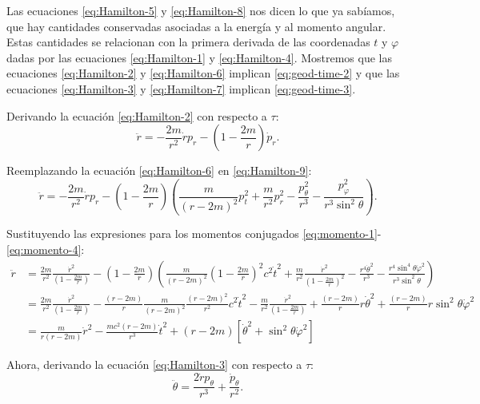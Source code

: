 \documentclass[letterpaper,11pt]{article}
\begin{document}
Las ecuaciones \eqref{eq:Hamilton-5} y \eqref{eq:Hamilton-8} nos dicen lo que ya sabíamos, que hay cantidades conservadas asociadas a la energía y al momento angular. Estas cantidades se relacionan con la primera derivada de las coordenadas $t$ y $\varphi$ dadas por las ecuaciones \eqref{eq:Hamilton-1} y \eqref{eq:Hamilton-4}. Mostremos que las ecuaciones \eqref{eq:Hamilton-2} y \eqref{eq:Hamilton-6} implican \eqref{eq:geod-time-2} y que las ecuaciones \eqref{eq:Hamilton-3} y \eqref{eq:Hamilton-7} implican \eqref{eq:geod-time-3}. 

Derivando la ecuación \eqref{eq:Hamilton-2} con respecto a $\tau$:
\begin{equation} \label{eq:Hamilton-9}
\ddot{r} = - \frac{2m}{r^2} \dot{r} p_r - \left( 1 - \frac{2m}{r}\right) \dot{p}_r.
\end{equation} 

Reemplazando la ecuación \eqref{eq:Hamilton-6} en \eqref{eq:Hamilton-9}:
\begin{equation}
\ddot{r} = - \frac{2m}{r^2} \dot{r} p_r - \left( 1 - \frac{2m}{r}\right) \left( \frac{m}{(r - 2m)^2} p_t^2 + \frac{m}{r^2} p_r^2 - \frac{p_{\theta}^2}{r^3} - \frac{p_{\varphi}^2}{r^3\sin^2\theta}  \right).
\end{equation} 

Sustituyendo las expresiones para los momentos conjugados \eqref{eq:momento-1}-\eqref{eq:momento-4}:
\begin{align}
\ddot{r} &= \frac{2m}{r^2} \frac{\dot{r}^2}{\left( 1 - \frac{2m}{r}\right)} - \left( 1 - \frac{2m}{r}\right) \left( \frac{m}{(r - 2m)^2}  \left( 1 - \frac{2m}{r}\right)^2 c^2 \dot{t}^2 + \frac{m}{r^2} \frac{\dot{r}^2}{\left( 1 - \frac{2m}{r}\right)^2} - \frac{r^4\dot{\theta}^2}{r^3} - \frac{r^4 \sin^4\theta \dot{\varphi}^2}{r^3\sin^2\theta}  \right)  \nonumber \\
&= \frac{2m}{r^2} \frac{\dot{r}^2}{\left( 1 - \frac{2m}{r}\right)} - \frac{(r-2m)}{r} \frac{m}{(r-2m)^2} \frac{(r-2m)^2}{r^2} c^2 \dot{t}^2 - \frac{m}{r^2} \frac{\dot{r}^2}{\left( 1 - \frac{2m}{r}\right)} + \frac{(r-2m)}{r} r \dot{\theta}^2 + \frac{(r-2m)}{r} r \sin^2\theta \dot{\varphi}^2 \nonumber \\
&= \frac{m}{r(r-2m)} \dot{r}^2 - \frac{mc^2(r-2m)}{r^3} \dot{t}^2 + (r-2m)\left[ \dot{\theta}^2 + \sin^2\theta \dot{\varphi}^2\right]
\end{align}

Ahora, derivando la ecuación \eqref{eq:Hamilton-3} con respecto a $\tau$:
\begin{equation} \label{eq:Hamilton-10}
\ddot{\theta} = \frac{2\dot{r} p_{\theta}}{r^3} + \frac{\dot{p}_{\theta}}{r^2}.
\end{equation} 
\end{document}
